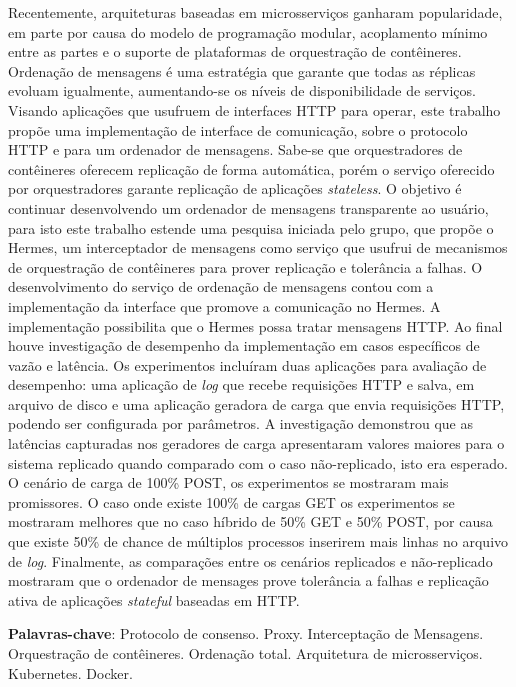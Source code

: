 \setlength{\absparsep}{18pt}
\begin{resumo}
\SingleSpacing

Recentemente, arquiteturas baseadas em microsserviços ganharam popularidade, em parte por causa do modelo de programação modular, acoplamento mínimo entre as partes e o suporte de plataformas de orquestração de contêineres. Ordenação de mensagens é uma estratégia que garante que todas as réplicas evoluam igualmente, aumentando-se os níveis de disponibilidade de serviços. Visando aplicações que usufruem de interfaces \gls{HTTP} para operar, este trabalho propõe uma implementação de interface de comunicação, sobre o protocolo HTTP e para um ordenador de mensagens. Sabe-se que orquestradores de contêineres oferecem replicação de forma automática, porém o serviço oferecido por orquestradores garante replicação de aplicações \textit{stateless}. O objetivo é continuar desenvolvendo um ordenador de mensagens transparente ao usuário, para isto este trabalho estende uma pesquisa iniciada pelo grupo, que propõe o Hermes, um interceptador de mensagens como serviço que usufrui de mecanismos de orquestração de contêineres para prover replicação e tolerância a falhas. O desenvolvimento do serviço de ordenação de mensagens contou com a implementação da interface que promove a comunicação no Hermes. A implementação possibilita que o Hermes possa tratar mensagens \gls{HTTP}. Ao final houve investigação de desempenho da implementação em casos específicos de vazão e latência. Os experimentos incluíram duas aplicações para avaliação de desempenho: uma aplicação de \textit{log} que recebe requisições HTTP e salva, em arquivo de disco e uma aplicação geradora de carga que envia requisições HTTP, podendo ser configurada por parâmetros. A investigação demonstrou que as latências capturadas nos geradores de carga apresentaram valores maiores para o sistema replicado quando comparado com o caso não-replicado, isto era esperado. O cenário de carga de 100\% POST, os experimentos se mostraram mais promissores. O caso onde existe 100\% de cargas GET os experimentos se mostraram melhores que no caso híbrido de 50\% GET e 50\% POST, por causa que existe 50\% de chance de múltiplos processos inserirem mais linhas no arquivo de \textit{log}. Finalmente, as comparações entre os cenários replicados e não-replicado mostraram que o ordenador de mensages prove tolerância a falhas e replicação ativa de aplicações \textit{stateful} baseadas em HTTP.

\textbf{Palavras-chave}: Protocolo de consenso. Proxy. Interceptação de Mensagens. Orquestração de contêineres. Ordenação total. Arquitetura de microsserviços. Kubernetes. Docker.
\end{resumo}
